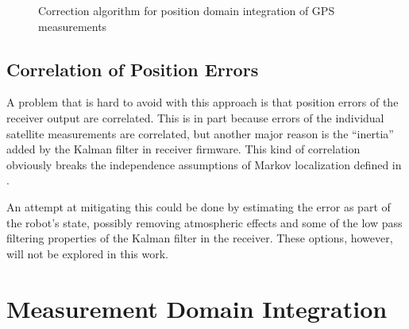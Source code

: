 \begin{figure}[tp]
\begin{algorithm}[H]


\end{algorithm}
\caption{Correction algorithm for position domain integration of GPS measurements}
\label{algo:gps-position-domain}
\end{figure}

\subsection{Correlation of Position Errors}
\label{sec:position-domain-correlation}
A problem that is hard to avoid with this approach is that position errors of the
receiver output are correlated.
This is in part because errors of the individual satellite measurements are correlated,
but another major reason
is the \enquote{inertia} added by the Kalman filter in receiver firmware.
This kind of correlation obviously breaks the independence assumptions of Markov
localization defined in .

An attempt at mitigating this could be done by estimating the error as part of
the robot's state, possibly removing atmospheric effects and some of the low pass
filtering properties of the Kalman filter in the receiver.
These options, however, will not be explored in this work.

\section{Measurement Domain Integration}
\label{sec:measurement-domain}

